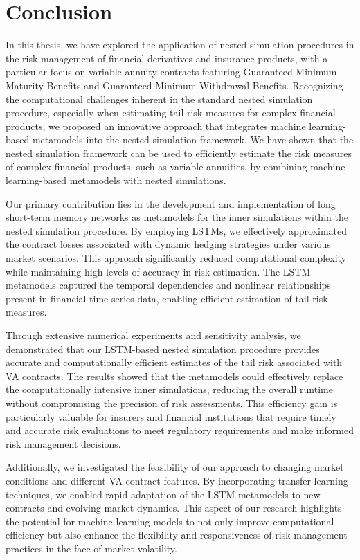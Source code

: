 \chapter{Conclusion} \label{chap:conclusion}

In this thesis, we have explored the application of nested simulation procedures in the risk management of financial derivatives and insurance products, with a particular focus on variable annuity contracts featuring Guaranteed Minimum Maturity Benefits and Guaranteed Minimum Withdrawal Benefits. 
Recognizing the computational challenges inherent in the standard nested simulation procedure, especially when estimating tail risk measures for complex financial products, we proposed an innovative approach that integrates machine learning-based metamodels into the nested simulation framework.
We have shown that the nested simulation framework can be used to efficiently estimate the risk measures of complex financial products, such as variable annuities, by combining machine learning-based metamodels with nested simulations.

Our primary contribution lies in the development and implementation of long short-term memory networks as metamodels for the inner simulations within the nested simulation procedure. 
By employing LSTMs, we effectively approximated the contract losses associated with dynamic hedging strategies under various market scenarios. 
This approach significantly reduced computational complexity while maintaining high levels of accuracy in risk estimation. 
The LSTM metamodels captured the temporal dependencies and nonlinear relationships present in financial time series data, enabling efficient estimation of tail risk measures.

Through extensive numerical experiments and sensitivity analysis, we demonstrated that our LSTM-based nested simulation procedure provides accurate and computationally efficient estimates of the tail risk associated with VA contracts. 
The results showed that the metamodels could effectively replace the computationally intensive inner simulations, reducing the overall runtime without compromising the precision of risk assessments.
This efficiency gain is particularly valuable for insurers and financial institutions that require timely and accurate risk evaluations to meet regulatory requirements and make informed risk management decisions.

Additionally, we investigated the feasibility of our approach to changing market conditions and different VA contract features. 
By incorporating transfer learning techniques, we enabled rapid adaptation of the LSTM metamodels to new contracts and evolving market dynamics. 
This aspect of our research highlights the potential for machine learning models to not only improve computational efficiency but also enhance the flexibility and responsiveness of risk management practices in the face of market volatility.

